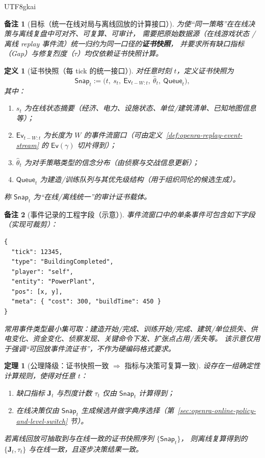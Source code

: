 \documentclass[12pt]{article}
\newtheorem{definition}{定义}[section]
\newtheorem{theorem}{定理}[section]
\newtheorem{remark}{备注}[section]
\begin{document}
\begin{CJK*}{UTF8}{gkai}
\begin{remark}[目标（统一在线对局与离线回放的计算接口）]
为使“同一策略”在在线决策与离线复盘中可对齐、可复算、可审计，
需要把原始数据源（在线游戏状态 / 离线 replay 事件流）统一归约为同一口径的\textbf{证书快照}，
并要求所有缺口指标（Gap）与修复烈度（$\tau$）均仅依赖证书快照计算。
\end{remark}

\begin{definition}[证书快照（每 tick 的统一接口）]
\label{def:openra-certificate-snapshot}
对任意时刻 $t$，定义证书快照为
\[
  \mathsf{Snap}_t
  :=
  \bigl(t,\ s_t,\ \mathsf{Ev}_{t-W:t},\ \widehat{\theta}_t,\ \mathsf{Queue}_t\bigr),
\]
其中：
\begin{enumerate}
  \item $s_t$ 为在线状态摘要（经济、电力、设施状态、单位/建筑清单、已知地图信息等）；
  \item $\mathsf{Ev}_{t-W:t}$ 为长度为 $W$ 的事件流窗口（可由定义~\ref{def:openra-replay-event-stream} 的 $\mathsf{Ev}(\gamma)$ 切片得到）；
  \item $\widehat{\theta}_t$ 为对手策略类型的信念分布（由侦察与交战信息更新）；
  \item $\mathsf{Queue}_t$ 为建造/训练队列与其优先级结构（用于组织同伦的候选生成）。
\end{enumerate}
称 $\mathsf{Snap}_t$ 为“在线/离线统一”的审计证书载体。
\end{definition}

\begin{remark}[事件记录的工程字段（示意）]
事件流窗口中的单条事件可包含如下字段（实现可裁剪）：
\begin{verbatim}
{
  "tick": 12345,
  "type": "BuildingCompleted",
  "player": "self",
  "entity": "PowerPlant",
  "pos": [x, y],
  "meta": { "cost": 300, "buildTime": 450 }
}
\end{verbatim}
常用事件类型最小集可取：建造开始/完成、训练开始/完成、建筑/单位损失、供电变化、资金变化、侦察发现、关键命令下发、扩张点占用/丢失等。
该示意仅用于强调“可回放事件流证书”，不作为硬编码格式要求。
\end{remark}

\begin{theorem}[公理降级：证书快照一致 $\Rightarrow$ 指标与决策可复算一致]
\label{thm:openra-snapshot-consistency-reproducible}
设存在一组确定性计算规则，使得对任意 $t$：
\begin{enumerate}
  \item 缺口指标 $\mathbf{J}_t$ 与烈度计数 $\tau_t$ 仅由 $\mathsf{Snap}_t$ 计算得到；
  \item 在线决策仅由 $\mathsf{Snap}_t$ 生成候选并做字典序选择（第~\ref{sec:openra-online-policy-and-level-switch} 节）。
\end{enumerate}
若离线回放可抽取到与在线一致的证书快照序列 $\{\mathsf{Snap}_t\}$，
则离线复算得到的 $\{\mathbf{J}_t,\tau_t\}$ 与在线一致，且逐步决策结果一致。
\end{theorem}


\end{CJK*}
\end{document}

